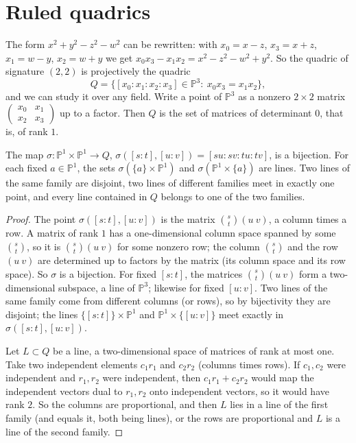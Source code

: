 \section{Ruled quadrics}\label{sec:ruled}

The form $x^2+y^2-z^2-w^2$ can be rewritten: with $x_0=x-z$, $x_3=x+z$, $x_1=w-y$, $x_2=w+y$ we get $x_0x_3-x_1x_2=x^2-z^2-w^2+y^2$. So the quadric of
signature $(2,2)$ is projectively the quadric
\[
Q=\{[x_0:x_1:x_2:x_3]\in\mathbb P^3:\ x_0x_3=x_1x_2\},
\]
and we can study it over any field. Write a point of $\mathbb P^3$ as a nonzero $2\times2$ matrix $\begin{pmatrix}x_0&x_1\\x_2&x_3\end{pmatrix}$ up to a
factor. Then $Q$ is the set of matrices of determinant $0$, that is, of rank $1$.

\begin{theorem}\label{thm:segre}
The map $\sigma:\mathbb P^1\times\mathbb P^1\to Q$, $\sigma([s:t],[u:v])=[su:sv:tu:tv]$, is a bijection. For each fixed $a\in\mathbb P^1$, the sets
$\sigma(\{a\}\times\mathbb P^1)$ and $\sigma(\mathbb P^1\times\{a\})$ are lines. Two lines of the same family are disjoint, two lines of different families
meet in exactly one point, and every line contained in $Q$ belongs to one of the two families.
\end{theorem}

\begin{proof}
The point $\sigma([s:t],[u:v])$ is the matrix $\binom st(u\ v)$, a column times a row. A matrix of rank $1$ has a one-dimensional column space spanned
by some $\binom st$, so it is $\binom st(u\ v)$ for some nonzero row; the column $\binom st$ and the row $(u\ v)$ are determined up to factors by
the matrix (its column space and its row space). So $\sigma$ is a bijection. For fixed $[s:t]$, the matrices $\binom st(u\ v)$ form a two-dimensional
subspace, a line of $\mathbb P^3$; likewise for fixed $[u:v]$. Two lines of the same family come from different columns (or rows), so by bijectivity
they are disjoint; the lines $\{[s:t]\}\times\mathbb P^1$ and $\mathbb P^1\times\{[u:v]\}$ meet exactly in $\sigma([s:t],[u:v])$.

Let $L\subset Q$ be a line, a two-dimensional space of matrices of rank at most one. Take two independent elements $c_1r_1$ and $c_2r_2$ (columns
times rows). If $c_1,c_2$ were independent and $r_1,r_2$ were independent, then $c_1r_1+c_2r_2$ would map the independent vectors dual to $r_1,r_2$
onto independent vectors, so it would have rank $2$. So the columns are proportional, and then $L$ lies in a line of the first family (and equals it,
both being lines), or the rows are proportional and $L$ is a line of the second family.
\end{proof}


